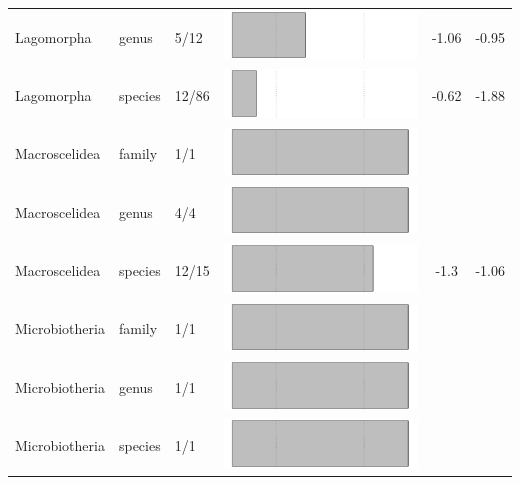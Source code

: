 \begin{longtable}{lL{1.8cm}C{2cm}lcc}
  Lagomorpha & genus & 5/12 & \includegraphics[width=0.20\linewidth, height=0.05\linewidth]{Supplementaries/Figures/Chapter2/Results_1c/Table_figures/bar35.pdf} & -1.06 & -0.95 \\ 
  Lagomorpha & species & 12/86 & \includegraphics[width=0.20\linewidth, height=0.05\linewidth]{Supplementaries/Figures/Chapter2/Results_1c/Table_figures/bar36.pdf} & -0.62 & -1.88 \\ 
  Macroscelidea & family & 1/1 & \includegraphics[width=0.20\linewidth, height=0.05\linewidth]{Supplementaries/Figures/Chapter2/Results_1c/Table_figures/bar37.pdf} &   &   \\ 
  Macroscelidea & genus & 4/4 & \includegraphics[width=0.20\linewidth, height=0.05\linewidth]{Supplementaries/Figures/Chapter2/Results_1c/Table_figures/bar38.pdf} &   &   \\ 
  Macroscelidea & species & 12/15 & \includegraphics[width=0.20\linewidth, height=0.05\linewidth]{Supplementaries/Figures/Chapter2/Results_1c/Table_figures/bar39.pdf} & -1.3 & -1.06 \\ 
  Microbiotheria & family & 1/1 & \includegraphics[width=0.20\linewidth, height=0.05\linewidth]{Supplementaries/Figures/Chapter2/Results_1c/Table_figures/bar40.pdf} &   &   \\ 
  Microbiotheria & genus & 1/1 & \includegraphics[width=0.20\linewidth, height=0.05\linewidth]{Supplementaries/Figures/Chapter2/Results_1c/Table_figures/bar41.pdf} &   &   \\ 
  Microbiotheria & species & 1/1 & \includegraphics[width=0.20\linewidth, height=0.05\linewidth]{Supplementaries/Figures/Chapter2/Results_1c/Table_figures/bar42.pdf} &   &   \\ 

\end{longtable}
